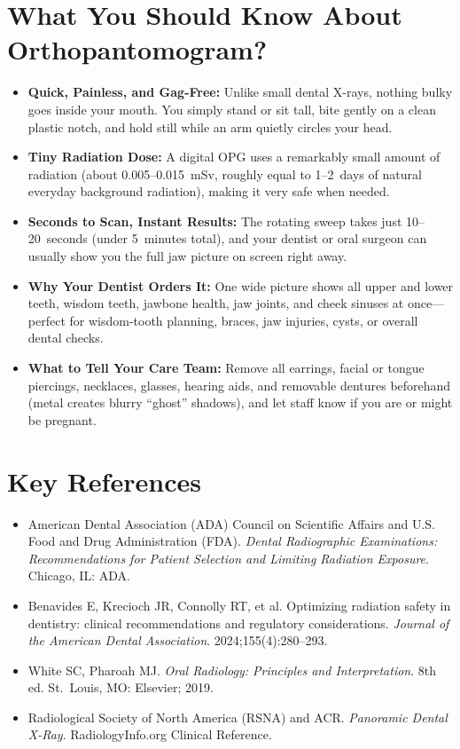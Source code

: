 \section{What You Should Know About Orthopantomogram?}
\begin{itemize}
\item \textbf{Quick, Painless, and Gag-Free:} Unlike small dental X-rays, nothing bulky goes inside your mouth. You simply stand or sit tall, bite gently on a clean plastic notch, and hold still while an arm quietly circles your head.
\item \textbf{Tiny Radiation Dose:} A digital OPG uses a remarkably small amount of radiation (about 0.005--0.015~mSv, roughly equal to 1--2~days of natural everyday background radiation), making it very safe when needed.
\item \textbf{Seconds to Scan, Instant Results:} The rotating sweep takes just 10--20~seconds (under 5~minutes total), and your dentist or oral surgeon can usually show you the full jaw picture on screen right away.
\item \textbf{Why Your Dentist Orders It:} One wide picture shows all upper and lower teeth, wisdom teeth, jawbone health, jaw joints, and cheek sinuses at once---perfect for wisdom-tooth planning, braces, jaw injuries, cysts, or overall dental checks.
\item \textbf{What to Tell Your Care Team:} Remove all earrings, facial or tongue piercings, necklaces, glasses, hearing aids, and removable dentures beforehand (metal creates blurry ``ghost'' shadows), and let staff know if you are or might be pregnant.
\end{itemize}

\section{Key References}
\begin{itemize}
\item American Dental Association (ADA) Council on Scientific Affairs and U.S. Food and Drug Administration (FDA). \textit{Dental Radiographic Examinations: Recommendations for Patient Selection and Limiting Radiation Exposure}. Chicago, IL: ADA.
\item Benavides E, Krecioch JR, Connolly RT, et al. Optimizing radiation safety in dentistry: clinical recommendations and regulatory considerations. \textit{Journal of the American Dental Association}. 2024;155(4):280--293.
\item White SC, Pharoah MJ. \textit{Oral Radiology: Principles and Interpretation}. 8th ed. St.~Louis, MO: Elsevier; 2019.
\item Radiological Society of North America (RSNA) and ACR. \textit{Panoramic Dental X-Ray}. RadiologyInfo.org Clinical Reference.
\end{itemize}
